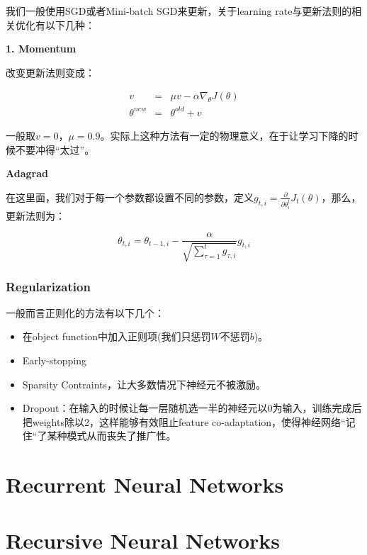 \documentclass{article}
\begin{document}
我们一般使用SGD或者Mini-batch SGD来更新，关于learning rate与更新法则的相关优化有以下几种：

\noindent \textbf{1. Momentum}

改变更新法则变成：

\begin{eqnarray}
v &=& \mu v - \alpha\nabla_\theta J(\theta) \\
\theta^{new} &=& \theta^{old} + v
\end{eqnarray}

一般取$v=0$，$\mu=0.9$。实际上这种方法有一定的物理意义，在于让学习下降的时候不要冲得“太过”。

\noindent \textbf{Adagrad}

在这里面，我们对于每一个参数都设置不同的参数，定义$g_{t,i}=\frac{\partial}{\partial \theta_i^t}J_t(\theta)$，那么，更新法则为：

$$\theta_{t,i}=\theta_{t-1,i}-\frac{\alpha}{\sqrt{\sum_{\tau=1}^{t}{g_{\tau,i}}}}g_{t,i}$$

\subsubsection*{Regularization}

一般而言正则化的方法有以下几个：

\begin{itemize}
	\item 在object function中加入正则项(我们只惩罚$W$不惩罚$b$)。
	\item Early-stopping
	\item Sparsity Contraints，让大多数情况下神经元不被激励。
	\item Dropout：在输入的时候让每一层随机选一半的神经元以0为输入，训练完成后把weights除以2，这样能够有效阻止feature co-adaptation，使得神经网络“记住“了某种模式从而丧失了推广性。
\end{itemize}
\section{Recurrent Neural Networks}

\section{Recursive Neural Networks}

\section{}
\end{document}
